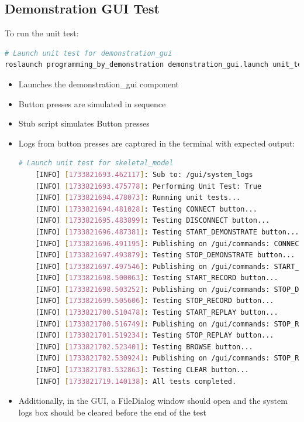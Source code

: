 \documentclass{CSSRforAfrica}
\begin{document}
\subsection*{Demonstration GUI Test}
To run the unit test:
\begin{lstlisting}[style=withoutNumbering, language=bash]
# Launch unit test for demonstration_gui
roslaunch programming_by_demonstration demonstration_gui.launch unit_test:=true
\end{lstlisting}

\begin{itemize}
    \item Launches the demonstration\_gui component
    \item Button presses are simulated in sequence  
    \item Stub script simulates Button presses 
    \item Logs from button presses are captured in the terminal with expected output: 
    \begin{lstlisting}[style=withoutNumbering, language=bash]
    # Launch unit test for skeletal_model
    [INFO] [1733821693.462117]: Sub to: /gui/system_logs
    [INFO] [1733821693.475778]: Performing Unit Test: True
    [INFO] [1733821694.478073]: Running unit tests...
    [INFO] [1733821694.481028]: Testing CONNECT button...
    [INFO] [1733821695.483899]: Testing DISCONNECT button...
    [INFO] [1733821696.487381]: Testing START_DEMONSTRATE button...
    [INFO] [1733821696.491195]: Publishing on /gui/commands: CONNECT,172.29.111.230,5995
    [INFO] [1733821697.493879]: Testing STOP_DEMONSTRATE button...
    [INFO] [1733821697.497546]: Publishing on /gui/commands: START_DEMONSTRATE
    [INFO] [1733821698.500063]: Testing START_RECORD button...
    [INFO] [1733821698.503252]: Publishing on /gui/commands: STOP_DEMONSTRATE
    [INFO] [1733821699.505606]: Testing STOP_RECORD button...
    [INFO] [1733821700.510478]: Testing START_REPLAY button...
    [INFO] [1733821700.516749]: Publishing on /gui/commands: STOP_RECORD
    [INFO] [1733821701.519234]: Testing STOP_REPLAY button...
    [INFO] [1733821702.523401]: Testing BROWSE button...
    [INFO] [1733821702.530924]: Publishing on /gui/commands: STOP_REPLAY
    [INFO] [1733821703.532863]: Testing CLEAR button...
    [INFO] [1733821719.140138]: All tests completed.
        \end{lstlisting}
    \item Additionally, in the GUI, a FileDialog window should open and the system logs box should be cleared before the end of the test
\end{itemize}
 ~\\~\\
\end{document}
